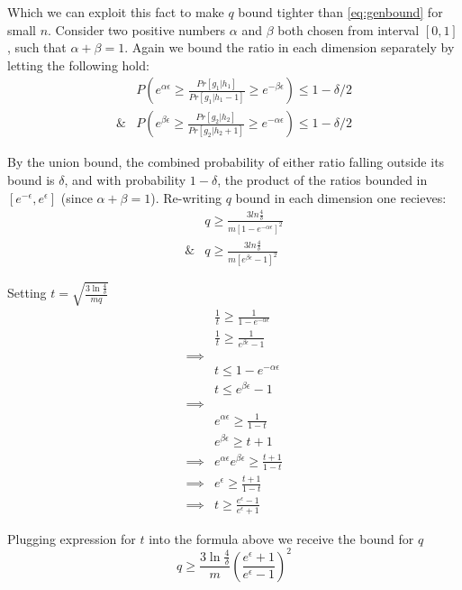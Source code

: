 \documentclass[11pt]{article}
\begin{document}
Which we can exploit this fact to make $q$ bound tighter than \ref{eq:genbound} for small $n$.   Consider two positive numbers $\alpha$ and $\beta$ both chosen from interval $[0,1]$, such that $\alpha + \beta = 1$.  Again we bound the ratio in each dimension separately by letting the following hold:
\begin{align} \label{lem:fk102}
& P \left (   e^{\alpha\epsilon}\ge \frac{  Pr[ g_1 | h_1]  } {  Pr[ g_1 | h_1 - 1] }  \ge e^{-\beta\epsilon} \right ) \le 1 - \delta/2 \\
\& & P \left (  e^{\beta\epsilon}  \ge \frac{  Pr[ g_2 | h_2]  } {  Pr[ g_2 | h_2 + 1]  }  \ge e^{-\alpha\epsilon}  \right ) \le 1 - \delta/2 
\end{align}

By the union bound, the combined probability of either ratio falling outside its bound is $\delta$, and with probability $1-\delta$, the product of the ratios  bounded in $[ e^{-\epsilon}, e^\epsilon]$ (since $\alpha + \beta = 1$).  Re-writing $q$ bound in each dimension one recieves:
\begin{align*}
 & q \ge \frac  { 3  ln\frac{4}{\delta}}  { m\left [ 1 - e^{-\alpha\epsilon}\right ] ^2} \\
\& & q \ge \frac  { 3  ln\frac{4}{\delta}}  { m\left [e^{\beta\epsilon} - 1 \right ] ^2}
\end{align*}

Setting $t= \sqrt{\frac{3\ln{\frac{4}{\delta}}}{mq}}$
\begin{align*}
 & \frac{1}{t}\ge \frac  {1}  { 1 - e^{-\alpha\epsilon}} \\
& \frac{1}{t} \ge \frac  {1}  {e^{\beta\epsilon} - 1} \\
\implies &  \\
& t \le 1 - e^{-\alpha\epsilon}  \\
& t \le e^{\beta\epsilon} - 1 \\
\implies &  \\
& e^{\alpha\epsilon} \ge \frac{1}{1-t} \\
&  e^{\beta\epsilon} \ge t + 1 \\
\implies & e^{\alpha\epsilon} e^{\beta\epsilon} \ge \frac{t+1}{1-t} \\
\implies & e^\epsilon \ge  \frac{t+1}{1-t} \\
\implies & t \ge  \frac{e^\epsilon-1}{e^\epsilon+1}
\end{align*}

Plugging expression for $t$ into the formula above we receive the bound for $q$
\begin{equation}
q \ge \frac{3\ln{\frac{4}{\delta}}}{m} \left (  \frac{e^\epsilon + 1}{e^\epsilon - 1} \right)^2 \label{eq:flipfake}
\end{equation}
\end{document}
